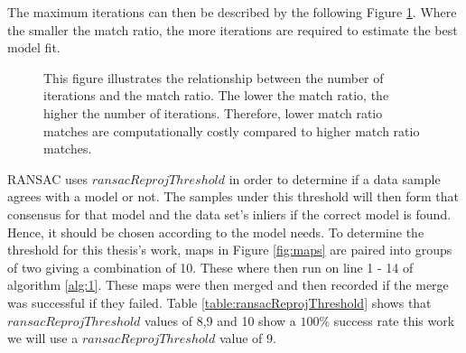 The maximum iterations can then be described by the following Figure \ref{fig:itervsmatch}. Where the smaller the match ratio, the more iterations are required to estimate the best model fit.
\begin{figure}[!h]
\centering
{}
\caption{This figure illustrates the relationship between the number of iterations and the match ratio. The lower the match ratio, the higher the number of iterations. Therefore, lower match ratio matches are computationally costly compared to higher match ratio matches.}
\label{fig:itervsmatch}
\end{figure}

RANSAC uses $ransacReprojThreshold$ in order to determine if a data sample agrees with a model or not. The samples under this threshold will then form that consensus for that model and the data set's inliers if the correct model is found. Hence, it should be chosen according to the model needs. To determine the threshold for this thesis's work, maps in Figure \ref{fig:maps} are paired into groups of two giving a combination of 10. These where then run on line 1 - 14 of algorithm \ref{alg:1}. These maps were then merged and then recorded if the merge was successful if they failed. Table \ref{table:ransacReprojThreshold} shows that $ransacReprojThreshold$ values of 8,9 and 10 show a $100\%$ success rate this work we will use a $ransacReprojThreshold$ value of 9. 


